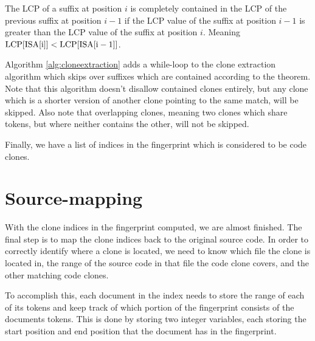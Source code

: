 \begin{theorem} 

    The LCP of a suffix at position $i$ is completely contained in the LCP of the previous
    suffix at position $i - 1$ if the LCP value of the suffix at position $i - 1$ is
    greater than the LCP value of the suffix at position $i$. Meaning $\mathrm{LCP}[{\mathrm{ISA}[{\mathrm{i}}]}]
    < \mathrm{LCP}[{\mathrm{ISA}[{\mathrm{i} - 1}]}]$.


\end{theorem}


Algorithm \ref{alg:cloneextraction} adds a while-loop to the clone extraction algorithm
which skips over suffixes which are contained according to the theorem. Note that this
algorithm doesn't disallow contained clones entirely, but any clone which is a shorter
version of another clone pointing to the same match, will be skipped. Also note that
overlapping clones, meaning two clones which share tokens, but where neither contains the
other, will not be skipped.

Finally, we have a list of indices in the fingerprint which is considered to be code
clones.

\section{Source-mapping}

With the clone indices in the fingerprint computed, we are almost finished. The final step
is to map the clone indices back to the original source code. In order to correctly
identify where a clone is located, we need to know which file the clone is located in, the
range of the source code in that file the code clone covers, and the other matching code
clones.

To accomplish this, each document in the index needs to store the range of each of its
tokens and keep track of which portion of the fingerprint consists of the documents
tokens. This is done by storing two integer variables, each storing the start position and
end position that the document has in the fingerprint. 

